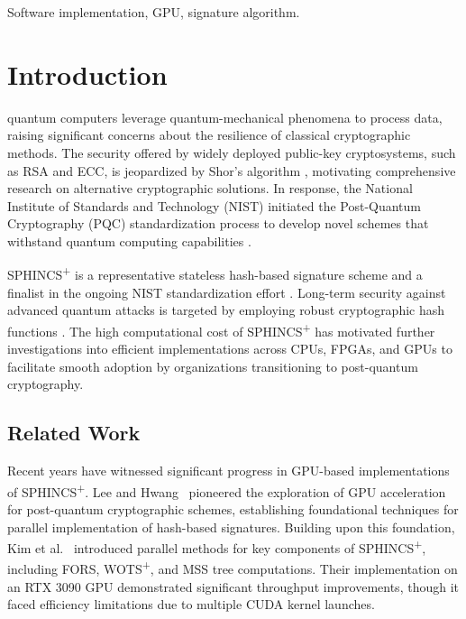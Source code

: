 \documentclass[journal]{IEEEtran}
\begin{document}
\begin{IEEEkeywords}
  Software implementation, GPU, signature algorithm.
\end{IEEEkeywords}

\section{Introduction}
\label{sec:intro}

 quantum computers leverage quantum-mechanical phenomena to process data, raising significant concerns about the resilience of classical cryptographic methods.
The security offered by widely deployed public-key cryptosystems, such as RSA and ECC, is jeopardized by Shor's algorithm \cite{Shor1994}, motivating comprehensive research on alternative cryptographic solutions. In response, the National Institute of Standards and Technology (NIST) initiated the Post-Quantum Cryptography (PQC) standardization process to develop novel schemes that withstand quantum computing capabilities \cite{NIST2016}.

SPHINCS\textsuperscript{+} is a representative stateless hash-based signature scheme and a finalist in the ongoing NIST standardization effort \cite{Turan}. Long-term security against advanced quantum attacks is targeted by employing robust cryptographic hash functions \cite{Bernstein2019}. The high computational cost of SPHINCS\textsuperscript{+} has motivated further investigations into efficient implementations across CPUs, FPGAs, and GPUs \cite{Joseph2022} to facilitate smooth adoption by organizations transitioning to post-quantum cryptography.

\color{blue}

\subsection{Related Work}

Recent years have witnessed significant progress in GPU-based implementations of SPHINCS\textsuperscript{+}. Lee and Hwang~\cite{Lee2022} pioneered the exploration of GPU acceleration for post-quantum cryptographic schemes, establishing foundational techniques for parallel implementation of hash-based signatures. Building upon this foundation, Kim et al.~\cite{Kim2024} introduced parallel methods for key components of SPHINCS\textsuperscript{+}, including FORS, WOTS\textsuperscript{+}, and MSS tree computations. Their implementation on an RTX 3090 GPU demonstrated significant throughput improvements, though it faced efficiency limitations due to multiple CUDA kernel launches.
\end{document}
